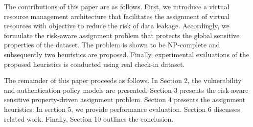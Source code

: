 The contributions of this paper are as follows. First, we introduce a virtual resource management architecture that facilitates the assignment of virtual resources with objective to reduce the risk of data leakage. Accordingly, we formulate the risk-aware assignment problem that protects the global sensitive properties of the dataset. The problem is shown to be NP-complete and subsequently two heuristics are proposed. Finally, experimental evaluations of the proposed heuristics is conducted using real check-in dataset.

The remainder of this paper proceeds as follows. In Section 2, the vulnerability and authentication policy models are presented. Section 3 presents the risk-aware sensitive property-driven assignment problem. Section 4 presents the assignment heuristics. In section 5, we provide performance evaluation. Section 6 discusses related work. Finally, Section 10 outlines the conclusion.
